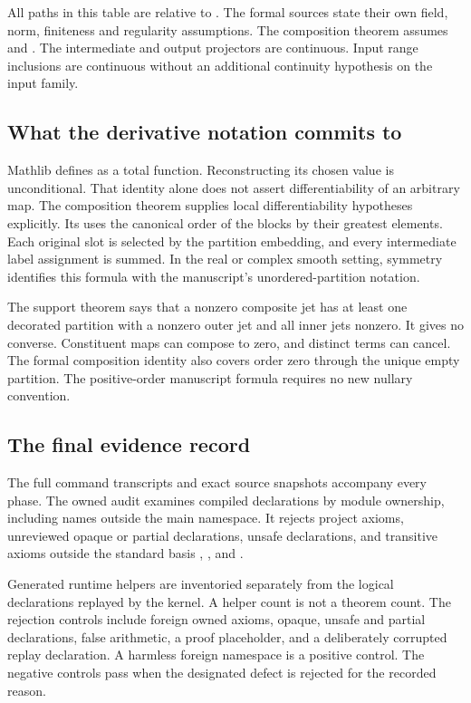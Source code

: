 All paths in this table are relative to . The formal sources state their own field, norm, finiteness and regularity assumptions. The composition theorem assumes  and . The intermediate and output projectors are continuous. Input range inclusions are continuous without an additional continuity hypothesis on the input family.

\subsection*{What the derivative notation commits to}
Mathlib defines  as a total function. Reconstructing its chosen value is unconditional. That identity alone does not assert differentiability of an arbitrary map. The composition theorem supplies local differentiability hypotheses explicitly. Its  uses the canonical order of the blocks by their greatest elements. Each original slot is selected by the partition embedding, and every intermediate label assignment is summed. In the real or complex smooth setting, symmetry identifies this formula with the manuscript's unordered-partition notation.

The support theorem says that a nonzero composite jet has at least one decorated partition with a nonzero outer jet and all inner jets nonzero. It gives no converse. Constituent maps can compose to zero, and distinct terms can cancel. The formal composition identity also covers order zero through the unique empty partition. The positive-order manuscript formula requires no new nullary convention.

\subsection*{The final evidence record}

The full command transcripts and exact source snapshots accompany every phase. The owned audit examines compiled declarations by module ownership, including names outside the main namespace. It rejects project axioms, unreviewed opaque or partial declarations, unsafe declarations, and transitive axioms outside the standard basis , , and .

Generated runtime helpers are inventoried separately from the logical declarations replayed by the kernel. A helper count is not a theorem count. The rejection controls include foreign owned axioms, opaque, unsafe and partial declarations, false arithmetic, a proof placeholder, and a deliberately corrupted replay declaration. A harmless foreign namespace is a positive control. The negative controls pass when the designated defect is rejected for the recorded reason.


